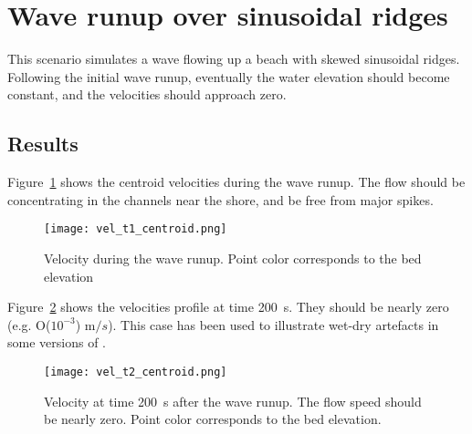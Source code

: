\section{Wave runup over sinusoidal ridges}
This scenario simulates a wave flowing up a beach with skewed sinusoidal ridges. Following the initial wave runup, eventually the water elevation should become constant, and the velocities should approach zero. 

\subsection{Results}
Figure~\ref{fig:vel_t1_centroid} shows the centroid velocities during the wave runup. The flow should be concentrating in the channels near the shore, and be free from major spikes.

\begin{figure}
\begin{center}
\texttt{[image: vel\_t1\_centroid.png]}
\caption{Velocity during the wave runup. Point color corresponds to the bed elevation}
\label{fig:vel_t1_centroid}
\end{center}
\end{figure}

Figure~\ref{fig:vel_t2_centroid} shows the velocities profile at time 200~s. They should be nearly zero (e.g. O($10^{-3}$) m$/s$). This case has been used to illustrate wet-dry artefacts in some versions of \anuga.

\begin{figure}
\begin{center}
\texttt{[image: vel\_t2\_centroid.png]}
\caption{Velocity at time 200~s after the wave runup. The flow speed should be nearly zero. Point color corresponds to the bed elevation.}
\label{fig:vel_t2_centroid}
\end{center}
\end{figure}

\endinput
